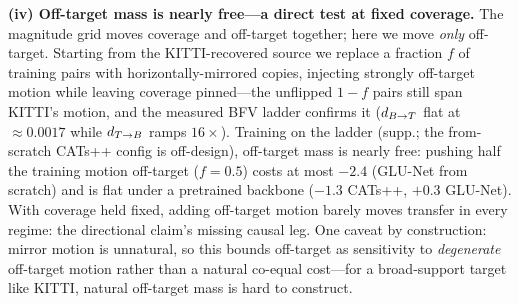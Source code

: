 \noindent\textbf{(iv) Off-target mass is nearly free---a direct test at fixed
coverage.} The magnitude grid moves coverage and off-target together; here we move
\emph{only} off-target. Starting from the KITTI-recovered source we replace a
fraction $f$ of training pairs with horizontally-mirrored copies, injecting
strongly off-target motion while leaving coverage pinned---the unflipped $1{-}f$
pairs still span KITTI's motion, and the measured BFV ladder confirms it ($d_{B\to T}$
flat at ${\approx}0.0017$ while $d_{T\to B}$ ramps $16\times$). Training on the ladder
(supp.; the from-scratch CATs++ config is off-design),
off-target mass is
nearly free: pushing half the training motion off-target ($f{=}0.5$) costs at most
$-2.4$ \pck{} (GLU-Net from scratch) and is flat under a pretrained backbone
($-1.3$ CATs++, $+0.3$ GLU-Net). With coverage held fixed, adding off-target motion
barely moves transfer in every regime: the directional claim's missing
causal leg. One caveat by construction: mirror motion is unnatural, so this bounds
off-target as sensitivity to \emph{degenerate} off-target motion rather than a
natural co-equal cost---for a broad-support target like KITTI, natural off-target
mass is hard to construct.

